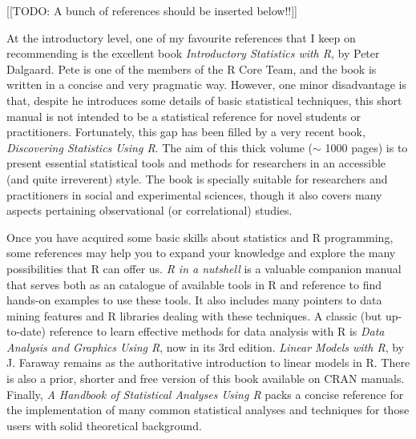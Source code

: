 [[TODO: A bunch of references should be inserted below!!]]

At the introductory level, one of my favourite references that I keep on recommending
is the excellent book \textit{Introductory Statistics with R}, by Peter Dalgaard.
Pete is one of the members of the R Core Team, and the book is written in a concise
and very pragmatic way. However, one minor disadvantage is that, despite he introduces
some details of basic statistical techniques, this short manual is not intended to
be a statistical reference for novel students or practitioners. Fortunately, this
gap has been filled by a very recent book, \textit{Discovering Statistics Using
R}. The aim of this thick volume ($\sim$ 1000 pages) is to present essential statistical
tools and methods for researchers in an accessible (and quite irreverent) style. The
book is specially suitable for researchers and practitioners in social and experimental
sciences, though it also covers many aspects pertaining observational (or
correlational) studies.

Once you have acquired some basic skills about statistics and R programming, some
references may help you to expand your knowledge and explore the many possibilities
that R can offer us. \textit{R in a nutshell} is a valuable companion manual that
serves both as an catalogue of available tools in R and reference to find hands-on
examples to use these tools. It also includes many pointers to data mining features
and R libraries dealing with these techniques. A classic (but up-to-date) reference
to learn effective methods for data analysis with R is \textit{Data Analysis and
Graphics Using R}, now in its 3rd edition. \textit{Linear Models with R}, by J.
Faraway remains as the authoritative introduction to linear models in R. There is
also a prior, shorter and free version of this book available on CRAN manuals.
Finally, \textit{A Handbook of Statistical
Analyses Using R} packs a concise reference for the implementation of many common
statistical analyses and techniques for those users with solid theoretical background. 


